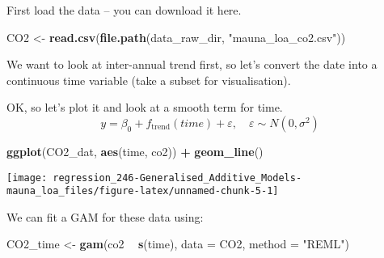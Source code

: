 \documentclass[]{book}
\newenvironment{Shaded}{\begin{snugshade}}{\end{snugshade}}
\newcommand{\DataTypeTok}[1]{\textcolor[rgb]{0.13,0.29,0.53}{#1}}
\newcommand{\DecValTok}[1]{\textcolor[rgb]{0.00,0.00,0.81}{#1}}
\newcommand{\KeywordTok}[1]{\textcolor[rgb]{0.13,0.29,0.53}{\textbf{#1}}}
\newcommand{\NormalTok}[1]{#1}
\newcommand{\OperatorTok}[1]{\textcolor[rgb]{0.81,0.36,0.00}{\textbf{#1}}}
\newcommand{\StringTok}[1]{\textcolor[rgb]{0.31,0.60,0.02}{#1}}
\begin{document}
First load the data -- you can download it here.

\begin{Shaded}
\begin{Highlighting}[]
\NormalTok{CO2 <-}\StringTok{ }\KeywordTok{read.csv}\NormalTok{(}\KeywordTok{file.path}\NormalTok{(data_raw_dir, }\StringTok{"mauna_loa_co2.csv"}\NormalTok{))}
\end{Highlighting}
\end{Shaded}

We want to look at inter-annual trend first, so let's convert the date into a continuous time variable (take a subset for visualisation).

\begin{Shaded}
\end{Shaded}

OK, so let's plot it and look at a smooth term for time.
\[y = \beta_0 + f_{\mathrm{trend}}(time) + \varepsilon, \quad \varepsilon \sim N(0, \sigma^2)\]

\begin{Shaded}
\begin{Highlighting}[]
\KeywordTok{ggplot}\NormalTok{(CO2_dat, }\KeywordTok{aes}\NormalTok{(time, co2)) }\OperatorTok{+}\StringTok{ }\KeywordTok{geom_line}\NormalTok{()}
\end{Highlighting}
\end{Shaded}

\begin{center}\texttt{[image: regression\_246-Generalised\_Additive\_Models-mauna\_loa\_files/figure-latex/unnamed-chunk-5-1]} \end{center}

We can fit a GAM for these data using:

\begin{Shaded}
\begin{Highlighting}[]
\NormalTok{CO2_time <-}\StringTok{ }\KeywordTok{gam}\NormalTok{(co2 }\OperatorTok{~}\StringTok{ }\KeywordTok{s}\NormalTok{(time), }\DataTypeTok{data =}\NormalTok{ CO2, }\DataTypeTok{method =} \StringTok{"REML"}\NormalTok{)}
\end{Highlighting}
\end{Shaded}
\end{document}
